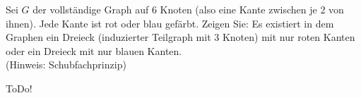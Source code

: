 
\begin{exercise}

Sei $G$ der vollständige Graph auf 6 Knoten (also eine Kante zwischen je 2 von ihnen).
Jede Kante ist rot oder blau gefärbt. Zeigen Sie: Es existiert in dem Graphen
ein Dreieck (induzierter Teilgraph mit 3 Knoten) mit nur roten Kanten oder ein Dreieck
mit nur blauen Kanten. \\
(Hinweis: Schubfachprinzip)
\end{exercise}


\begin{solution}

ToDo!

\end{solution}

